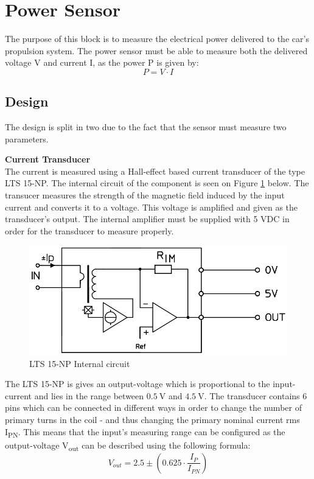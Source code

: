 \newpage
\section{Power Sensor}
The purpose of this block is to measure the electrical power delivered to the car's propulsion system. The power sensor must be able to measure both the delivered voltage V and  current I, as the power P is given by:
\begin{equation}
	P = V \cdot I
\end{equation}

\subsection{Design}
The design is split in two due to the fact that the sensor must measure two parameters.

\textbf{Current Transducer}\\
The current is measured using a Hall-effect based current transducer of the type LTS 15-NP\cite{CurrentTransducer}. The internal circuit of the component is seen on Figure \ref{fig:LTS_internal_circuit} below. The transucer measures the strength of the magnetic field induced by the input current and converts it to a voltage. This voltage is amplified and given as the transducer's output. The internal amplifier must be supplied with 5 VDC in order for the transducer to measure properly.

\begin{figure}[H]
	\centering
	\includegraphics[width=0.5\linewidth]{Hardware/Pictures/LTS_circuit}
	\caption{LTS 15-NP Internal circuit}
	\label{fig:LTS_internal_circuit}
\end{figure}

The LTS 15-NP is gives an output-voltage which is proportional to the input-current and lies in the range between $\SI{0.5}{\volt}$ and $\SI{4.5}{\volt}$. The transducer contains 6 pins which can be connected in different ways in order to change the number of primary turns in the coil - and thus changing the primary nominal current rms I\textsubscript{PN}\cite{CurrentTransducer}. This means that the input's measuring range can be configured as the output-voltage V\textsubscript{out} can be described using the following formula:
\begin{equation}
	V_{out} = 2.5 \pm \left( 0.625 \cdot \frac{I_{P}}{I_{PN}} \right)
	\label{eq:current_transducer}
\end{equation}

